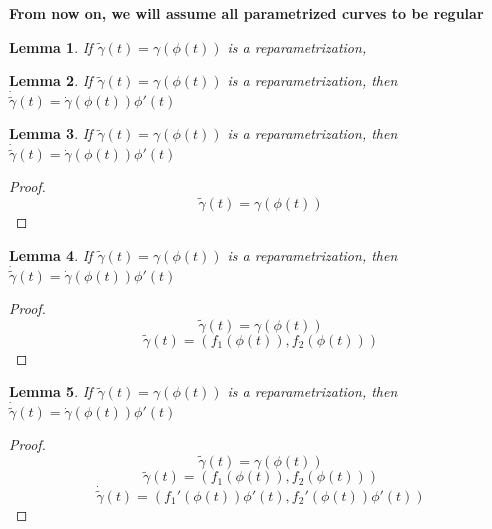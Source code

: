 \documentclass[twocolumn,20pt,fleqn]{extarticle}
\theoremstyle{plain}
\newtheorem*{lemma}{Lemma}
\theoremstyle{definition}
\theoremstyle{remark}
\begin{document}
\textbf{From now on, we will assume all parametrized curves to be regular}



\clearpage



\begin{lemma}
If $\tilde{\gamma}(t) = \gamma(\phi(t))$ is a reparametrization,\end{lemma}


\clearpage



\begin{lemma}
If $\tilde{\gamma}(t) = \gamma(\phi(t))$ is a reparametrization, then $\dot{\tilde{\gamma}}(t) = \dot{\gamma}(\phi(t))\phi'(t)$\end{lemma}


\clearpage



\begin{lemma}
If $\tilde{\gamma}(t) = \gamma(\phi(t))$ is a reparametrization, then $\dot{\tilde{\gamma}}(t) = \dot{\gamma}(\phi(t))\phi'(t)$
\end{lemma}
\begin{proof}
\[\tilde{\gamma}(t) = \gamma(\phi(t))\]\end{proof}


\clearpage



\begin{lemma}
If $\tilde{\gamma}(t) = \gamma(\phi(t))$ is a reparametrization, then $\dot{\tilde{\gamma}}(t) = \dot{\gamma}(\phi(t))\phi'(t)$
\end{lemma}
\begin{proof}
\[\tilde{\gamma}(t) = \gamma(\phi(t))\]
\[\tilde{\gamma}(t) = (f_1(\phi(t)), f_2(\phi(t)))\]\end{proof}


\clearpage



\begin{lemma}
If $\tilde{\gamma}(t) = \gamma(\phi(t))$ is a reparametrization, then $\dot{\tilde{\gamma}}(t) = \dot{\gamma}(\phi(t))\phi'(t)$
\end{lemma}
\begin{proof}
\[\tilde{\gamma}(t) = \gamma(\phi(t))\]
\[\tilde{\gamma}(t) = (f_1(\phi(t)), f_2(\phi(t)))\]
\[\dot{\tilde{\gamma}}(t) = (f_1'(\phi(t))\phi'(t), f_2'(\phi(t))\phi'(t))\]\end{proof}


\clearpage
\end{document}
